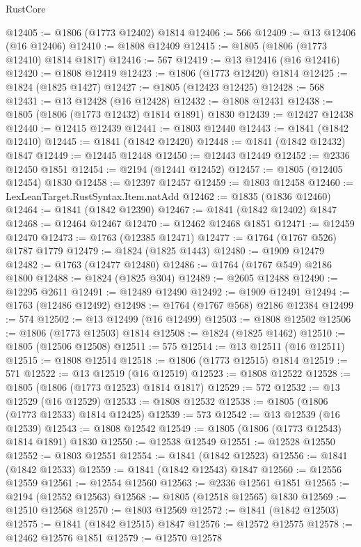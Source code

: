 \begin{lexlean}{RustCore}
\begin{coremodule}
@12405 := @1806 (@1773 @12402) @1814
@12406 := 566
@12409 := @13 @12406 (@16 @12406)
@12410 := @1808 @12409
@12415 := @1805 (@1806 (@1773 @12410) @1814 @1817)
@12416 := 567
@12419 := @13 @12416 (@16 @12416)
@12420 := @1808 @12419
@12423 := @1806 (@1773 @12420) @1814
@12425 := @1824 (@1825 @1427)
@12427 := @1805 (@12423 @12425)
@12428 := 568
@12431 := @13 @12428 (@16 @12428)
@12432 := @1808 @12431
@12438 := @1805 (@1806 (@1773 @12432) @1814 @1891) @1830
@12439 := @12427 @12438
@12440 := @12415 @12439
@12441 := @1803 @12440
@12443 := @1841 (@1842 @12410)
@12445 := @1841 (@1842 @12420)
@12448 := @1841 (@1842 @12432) @1847
@12449 := @12445 @12448
@12450 := @12443 @12449
@12452 := @2336 @12450 @1851
@12454 := @2194 (@12441 @12452)
@12457 := @1805 (@12405 @12454) @1830
@12458 := @12397 @12457
@12459 := @1803 @12458
@12460 := LexLeanTarget.RustSyntax.Item.natAdd
@12462 := @1835 (@1836 @12460)
@12464 := @1841 (@1842 @12390)
@12467 := @1841 (@1842 @12402) @1847
@12468 := @12464 @12467
@12470 := @12462 @12468 @1851
@12471 := @12459 @12470
@12473 := @1763 (@12385 @12471)
@12477 := @1764 (@1767 @526) @1787 @1779
@12479 := @1824 (@1825 @1443)
@12480 := @1909 @12479
@12482 := @1763 (@12477 @12480)
@12486 := @1764 (@1767 @549) @2186 @1800
@12488 := @1824 (@1825 @304)
@12489 := @2605 @12488
@12490 := @12295 @2611
@12491 := @12489 @12490
@12492 := @1909 @12491
@12494 := @1763 (@12486 @12492)
@12498 := @1764 (@1767 @568) @2186 @12384
@12499 := 574
@12502 := @13 @12499 (@16 @12499)
@12503 := @1808 @12502
@12506 := @1806 (@1773 @12503) @1814
@12508 := @1824 (@1825 @1462)
@12510 := @1805 (@12506 @12508)
@12511 := 575
@12514 := @13 @12511 (@16 @12511)
@12515 := @1808 @12514
@12518 := @1806 (@1773 @12515) @1814
@12519 := 571
@12522 := @13 @12519 (@16 @12519)
@12523 := @1808 @12522
@12528 := @1805 (@1806 (@1773 @12523) @1814 @1817)
@12529 := 572
@12532 := @13 @12529 (@16 @12529)
@12533 := @1808 @12532
@12538 := @1805 (@1806 (@1773 @12533) @1814 @12425)
@12539 := 573
@12542 := @13 @12539 (@16 @12539)
@12543 := @1808 @12542
@12549 := @1805 (@1806 (@1773 @12543) @1814 @1891) @1830
@12550 := @12538 @12549
@12551 := @12528 @12550
@12552 := @1803 @12551
@12554 := @1841 (@1842 @12523)
@12556 := @1841 (@1842 @12533)
@12559 := @1841 (@1842 @12543) @1847
@12560 := @12556 @12559
@12561 := @12554 @12560
@12563 := @2336 @12561 @1851
@12565 := @2194 (@12552 @12563)
@12568 := @1805 (@12518 @12565) @1830
@12569 := @12510 @12568
@12570 := @1803 @12569
@12572 := @1841 (@1842 @12503)
@12575 := @1841 (@1842 @12515) @1847
@12576 := @12572 @12575
@12578 := @12462 @12576 @1851
@12579 := @12570 @12578

\end{coremodule}
\end{lexlean}
